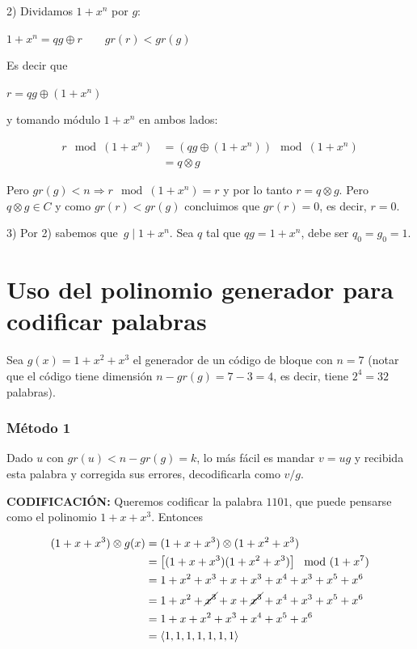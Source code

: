 \documentclass[10pt,a4paper]{article}
\begin{document}
2) Dividamos $1 + x^n$ por $g$:

\begin{center}
$1 + x^n = qg \oplus r \quad\quad gr(r) < gr(g)$
\end{center}

Es decir que

\begin{center}
$ r = qg \oplus (1 + x ^n) $
\end{center}

y tomando módulo $1 + x^n$ en ambos lados:

\begin{center}
\begin{align*} r \mod(1+x^n) &= \left(qg \oplus (1 + x ^n)\right)\mod(1+x^n)\\ &= q \otimes g \end{align*}
\end{center}

Pero $gr(g) < n \Rightarrow r \mod(1+x^n) = r$ y por lo tanto $r = q \otimes g$. Pero $q \otimes g \in C$ y como $gr(r) < gr(g)$ concluimos que $gr(r) = 0$, es decir, $r = 0$.

3) Por 2) sabemos que $g\;\lvert\; 1 + x^n$. Sea $q$ tal que $qg = 1 + x^n$, debe ser $q_0 = g_0 = 1$.

\section*{Uso del polinomio generador para codificar palabras}

Sea $g(x) = 1 + x^2 + x^3$ el generador de un código de bloque con $n = 7$ (notar que el código tiene dimensión $n - gr(g) = 7 - 3 = 4$, es decir, tiene $2^4 = 32$ palabras).

\subsubsection*{Método 1}

Dado $u$ con $gr(u) < n - gr(g) = k$, lo más fácil es mandar $v = ug$ y recibida esta palabra y corregida sus errores, decodificarla como $v/g$.

\textbf{CODIFICACIÓN: }Queremos codificar la palabra $1101$, que puede pensarse como el polinomio $1 + x + x^3$. Entonces

\begin{center}
\begin{align*} (1+x+x^3)\otimes g(x) &=(1+x+x^3)\otimes (1+x^2+x^3)\\ &= \left[(1+x+x^3) (1+x^2+x^3)\right]\mod(1 + x^7)\\ &= 1+x^2 + x^3+x+x^3+x^4+x^3+x^5+x^6 \\ &= 1+x^2 + \cancel{x^3}+x+\cancel{x^3}+x^4+x^3+x^5+x^6 \\ &= 1 + x + x^2+x^3+x^4+x^5+x^6\\ &= \langle 1,1,1,1,1,1,1\rangle \end{align*}
\end{center}
\end{document}
